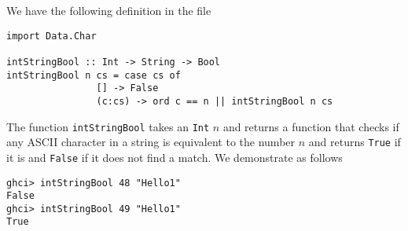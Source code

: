 
We have the following definition in the file 
\begin{verbatim}
import Data.Char

intStringBool :: Int -> String -> Bool
intStringBool n cs = case cs of
                [] -> False
                (c:cs) -> ord c == n || intStringBool n cs
\end{verbatim}

The function \verb|intStringBool| takes an \verb|Int| $n$ and returns a function
that checks if any ASCII character in a string is equivalent to the number $n$ and
returns \verb|True| if it is and \verb|False| if it does not find a match. We
demonstrate as follows
\begin{verbatim}
ghci> intStringBool 48 "Hello1"
False
ghci> intStringBool 49 "Hello1"
True
\end{verbatim}
